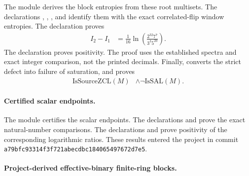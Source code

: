 \documentclass{article}
\begin{document}
The module  derives the block
entropies from these root multisets. The declarations
,
,
, and
 identify them with
the exact correlated-flip window entropies. The declaration
 proves
\begin{align}
    I_2-I_1
        &= \frac{1}{16}
            \ln\!\left(\frac{2^{32}7^7}{3^3 5^{20}}\right).
    \label{eq:cpsv16_examples_4_10_4_11_entropy_example410_formal_defect}
\end{align}
The declaration
 proves
positivity. The proof uses the established spectra and exact integer
comparison, not the printed decimals. Finally,
 converts the strict defect
into failure of saturation, and
 proves
\begin{align}
    \mathrm{IsSourceZCL}(M)
        &\mathbin{\land}\neg\mathrm{IsSAL}(M).
    \label{eq:cpsv16_examples_4_10_4_11_entropy_example410_zcl_not_sal}
\end{align}

\paragraph{Certified scalar endpoints.}

The module
 certifies the scalar
endpoints. The declarations
 and
 prove the
exact natural-number comparisons. The declarations
 and
 prove
positivity of the corresponding logarithmic ratios. These results entered the
project in commit \texttt{a79bfc93314f3f721abecdbc184065497672d7e5}.

\paragraph{Project-derived effective-binary finite-ring blocks.}
\end{document}
